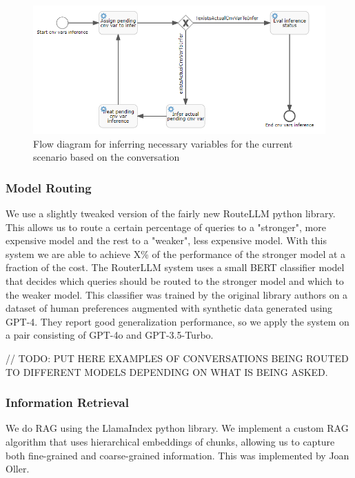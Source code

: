 \documentclass[a4paper,12pt,twoside]{ThesisStyle}
\begin{document}
\begin{figure}[htb]
  \centering
  \includegraphics[width=1\textwidth]{imatges/5_InferVariablesProcess.png}
  \caption{Flow diagram for inferring necessary variables for the current scenario based on the conversation}
\end{figure}



\subsubsection{Model Routing}

We use a slightly tweaked version of the fairly new RouteLLM python library. This allows us to route a certain percentage of queries to a "stronger", more expensive model and the rest to a "weaker", less expensive model. With this system we are able to achieve X\% of the performance of the stronger model at a fraction of the cost. The RouterLLM system uses a small BERT classifier model that decides which queries should be routed to the stronger model and which to the weaker model. This classifier was trained by the original library authors on a dataset of human preferences augmented with synthetic data generated using GPT-4. They report good generalization performance, so we apply the system on a pair consisting of GPT-4o and GPT-3.5-Turbo.

// TODO: PUT HERE EXAMPLES OF CONVERSATIONS BEING ROUTED TO DIFFERENT MODELS DEPENDING ON WHAT IS BEING ASKED.


\subsubsection{Information Retrieval}

We do RAG using the LlamaIndex python library. We implement a custom RAG algorithm that uses hierarchical embeddings of chunks, allowing us to capture both fine-grained and coarse-grained information. This was implemented by Joan Oller.
\end{document}
